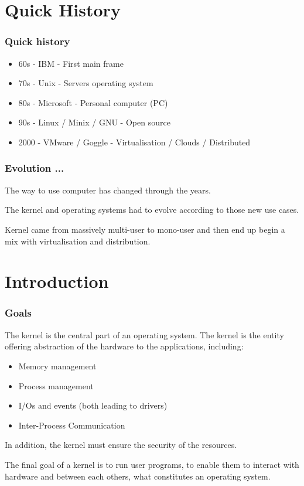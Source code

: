 %
%

\section{Quick History}

\begin{frame}
\frametitle{Quick history}

        \begin{itemize}
                \item 60s - IBM - First main frame
                \item 70s - Unix - Servers operating system 
                \item 80s - Microsoft  - Personal computer (PC)
                \item 90s - Linux / Minix / GNU - Open source
                \item 2000 - VMware / Goggle - Virtualisation / Clouds / Distributed 
        \end{itemize}

\end{frame}

\begin{frame}
\frametitle{Evolution ...}
The way to use computer has changed through the years.

  \-

The kernel and operating systems had to evolve according to those new
use cases.

  \-

Kernel came from massively multi-user to mono-user and then end up begin a mix with virtualisation and distribution.
\end{frame}

\section{Introduction}


\begin{frame}
  \frametitle{Goals}

  The kernel is the central part of an operating system. The kernel is the entity offering abstraction of the hardware to the applications, including:

  \begin{itemize}
  \item
    Memory management
  \item
    Process management
  \item
    I/Os and events (both leading to drivers)
  \item
    Inter-Process Communication
  \end{itemize}

  In addition, the kernel must ensure the security of the resources.

  \-

  The final goal of a kernel is to run user programs, to enable them
  to interact with hardware and between each others, what constitutes
  an operating system.

\end{frame}

